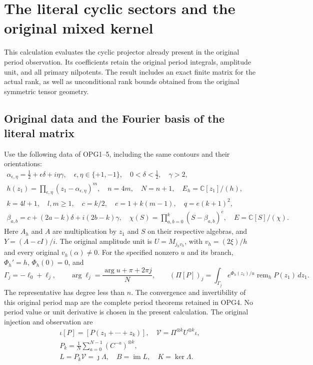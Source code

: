 \documentclass[11pt,a4paper]{article}
\begin{document}
\clearpage
\section{The literal cyclic sectors and the original mixed kernel}
\label{sec:OCS}

This calculation evaluates the cyclic projector already present in
the original period observation. Its coefficients retain the original
period integrals, amplitude unit, and all primary nilpotents. The
result includes an exact finite matrix for the actual rank, as well
as unconditional rank bounds obtained from the original symmetric
tensor geometry.

\subsection{Original data and the Fourier basis of the literal matrix}
Use the following data of OPG1--5, including the same contours and
their orientations:
\[
 \begin{gathered}
 \alpha_{\epsilon,\eta}=\tfrac12+\epsilon\delta+i\eta\gamma,
 \quad\epsilon,\eta\in\{+1,-1\},\quad0<\delta<\tfrac12,\quad\gamma>2,\\
 h(z_1)=\prod_{\epsilon,\eta}(z_1-\alpha_{\epsilon,\eta})^m,
 \quad n=4m,\quad N=n+1,\quad E_h=\mathbb C[z_1]/(h),\\
 k=4l+1,\quad l,m\geq1,\quad c=k/2,
 \quad e=1+k(m-1),\quad q=e(k+1)^2,\\
 \beta_{a,b}=c+(2a-k)\delta+i(2b-k)\gamma,
 \quad\chi(S)=\prod_{a,b=0}^k(S-\beta_{a,b})^e,
 \quad E=\mathbb C[S]/(\chi).
 \end{gathered}\tag{OCS1}
\]
Here $A_h$ and $A$ are multiplication by $z_1$ and $S$ on their
respective algebras, and $Y=(A-cI)/i$. The original amplitude
unit is $U=M_{j_hv_h}$, with $v_h=(2\xi)/h$ and every original
$v_h(\alpha)\ne0$. For the specified nonzero $u$ and its branch,
$\Phi_h'=h$, $\Phi_h(0)=0$, and
\[
 \Gamma_j=-\ell_0+\ell_j,\qquad
 \arg\ell_j=\frac{\arg u+\pi+2\pi j}{N},\qquad
 (\Pi[P])_j=\int_{\Gamma_j}e^{\Phi_h(z_1)/u}
                       \operatorname{rem}_hP(z_1)\,dz_1.
 \tag{OCS2}
\]
The representative has degree less than $n$. The convergence and
invertibility of this original period map are the complete period
theorems retained in OPG4. No period value or unit derivative is
chosen in the present calculation. The original injection and
observation are
\[
\begin{gathered}
 \iota[P]=[P(z_1+\cdots+z_k)],\quad
 \mathcal V=\Pi^{\otimes k}U^{\otimes k}\iota,
 \\ P_k=\frac1N\sum_{a=0}^{N-1}(C^{-a})^{\otimes k},
 \\ L=P_k\mathcal V=\jmath\Lambda,
 \quad B=\operatorname{im}L,\quad K=\ker\Lambda.
\end{gathered}\tag{OCS3}
\]
\end{document}
